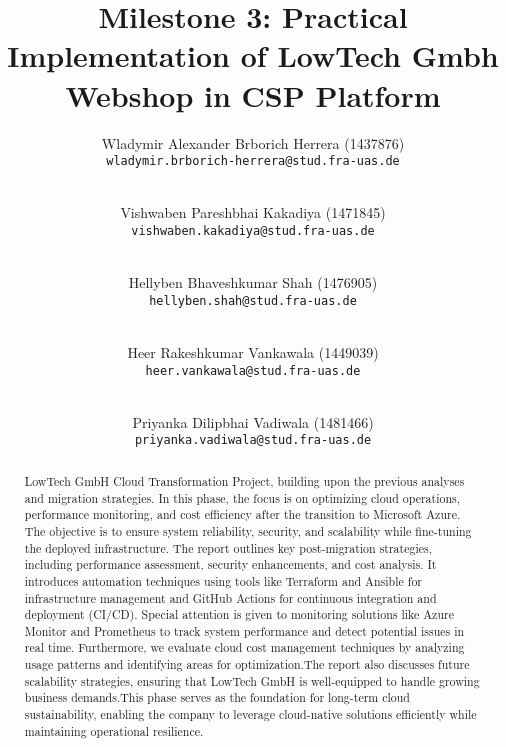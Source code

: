 \documentclass{llncs}
\newcommand{\what}{Milestone 3: Practical Implementation of LowTech Gmbh Webshop in CSP Platform}
\begin{document}
%
%
%
\mainmatter              %
%
\title{\what}
%
\author{
    Wladymir Alexander Brborich Herrera (1437876)\\
    \texttt{wladymir.brborich-herrera@stud.fra-uas.de}
    \and\\
    Vishwaben Pareshbhai Kakadiya (1471845)\\
    \texttt{vishwaben.kakadiya@stud.fra-uas.de}
    \and\\
    Hellyben Bhaveshkumar Shah (1476905)\\
    \texttt{hellyben.shah@stud.fra-uas.de}
    \and\\
    Heer Rakeshkumar Vankawala (1449039)
    \\
    \texttt{heer.vankawala@stud.fra-uas.de}
    \and\\
    Priyanka Dilipbhai Vadiwala (1481466)\\
    \texttt{priyanka.vadiwala@stud.fra-uas.de}
}
%

\maketitle              %


\begin{abstract}
    LowTech GmbH Cloud Transformation Project, building upon the previous analyses and migration strategies. In this phase, 
    the focus is on optimizing cloud operations, performance monitoring, and cost efficiency after the transition to Microsoft
    Azure. The objective is to ensure system reliability, security, and scalability while fine-tuning the deployed infrastructure.
    The report outlines key post-migration strategies, including performance assessment, security enhancements, and cost analysis. 
    It introduces automation techniques using tools like Terraform and Ansible for infrastructure management and GitHub Actions for 
    continuous integration and deployment (CI/CD). Special attention is given to monitoring solutions like Azure Monitor and Prometheus
    to track system performance and detect potential issues in real time. Furthermore, we evaluate cloud cost management techniques by 
    analyzing usage patterns and identifying areas for optimization.The report also discusses future scalability strategies,
    ensuring that LowTech GmbH is well-equipped to handle growing business demands.This phase serves as the foundation for long-term 
    cloud sustainability, enabling the company to leverage cloud-native solutions efficiently while maintaining operational resilience.
\end{abstract}
\end{document}
